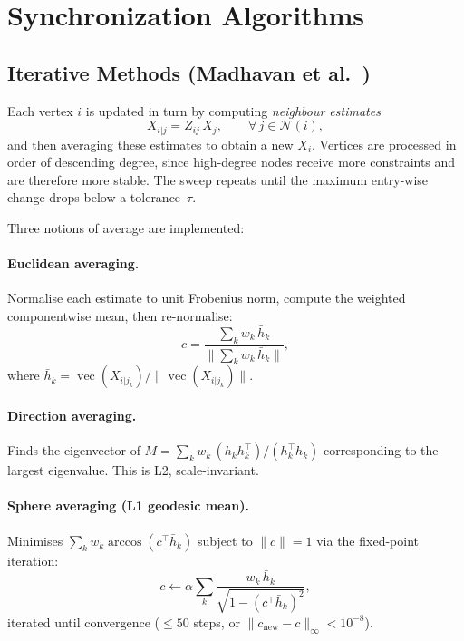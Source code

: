 \documentclass[11pt, a4paper]{article}
\begin{document}
\section{Synchronization Algorithms}
\label{sec:algorithms}

\subsection{Iterative Methods (Madhavan et al.~\cite{madhavan2024})}

Each vertex $i$ is updated in turn by computing \emph{neighbour estimates}
\begin{equation}
    X_{i|j} = Z_{ij} \, X_j, \qquad \forall\, j \in \mathcal{N}(i),
    \label{eq:neighbour_est}
\end{equation}
and then averaging these estimates to obtain a new $X_i$.  Vertices are
processed in order of descending degree, since high-degree nodes receive more
constraints and are therefore more stable.  The sweep repeats until the maximum
entry-wise change drops below a tolerance~$\tau$.

Three notions of average are implemented:

\paragraph{Euclidean averaging.}
Normalise each estimate to unit Frobenius norm, compute the weighted
componentwise mean, then re-normalise:
\begin{equation}
    c = \frac{\sum_k w_k \, \bar{h}_k}{\|\sum_k w_k \, \bar{h}_k\|},
\end{equation}
where $\bar{h}_k = \operatorname{vec}(X_{i|j_k}) / \|\operatorname{vec}(X_{i|j_k})\|$.

\paragraph{Direction averaging.}
Finds the eigenvector of
$M = \sum_k w_k \, (h_k h_k^\top) / (h_k^\top h_k)$
corresponding to the largest eigenvalue.  This is L2, scale-invariant.

\paragraph{Sphere averaging (L1 geodesic mean).}
Minimises $\sum_k w_k \arccos(c^\top \bar{h}_k)$ subject to $\|c\|=1$ via the
fixed-point iteration:
\begin{equation}
    c \leftarrow \alpha \sum_k
        \frac{w_k \, \bar{h}_k}{\sqrt{1 - (c^\top \bar{h}_k)^2}},
    \label{eq:sphere_fp}
\end{equation}
iterated until convergence ($\leq 50$ steps, or $\|c_{\text{new}} - c\|_\infty < 10^{-8}$).
\end{document}
